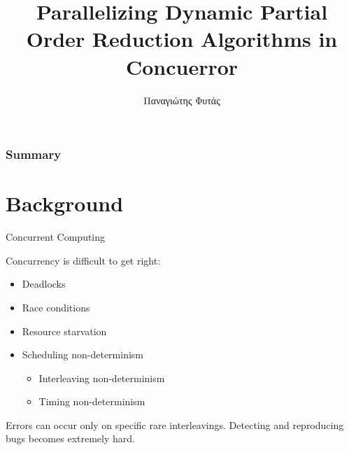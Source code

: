 \documentclass[9pt]{beamer}
\title[Short title]{Parallelizing Dynamic Partial Order Reduction Algorithms in Concuerror} %
\author{Παναγιώτης Φυτάς} %
\institute[NTUA] %
{
ΣΗΜΜΥ - ΕΜΠ \\ %
\medskip
\textit{03112113} %
}
\date{} %
\begin{document}
\begin{frame}
\titlepage %
\end{frame}

\begin{frame}
\frametitle{Summary} %
\tableofcontents %
\end{frame}






\AtBeginSection{\frame{\sectionpage}}
\section{Background}

\begin{frame}{Concurrent Computing}

Concurrency is difficult to get right:
\pause
\begin{itemize}[<+->]
    \item Deadlocks
    \item Race conditions
    \item Resource starvation 
    \item Scheduling non-determinism
    \begin{itemize}[<+->]
        \item Interleaving non-determinism
        \item Timing non-determinism
    \end{itemize}
\end{itemize}
\pause
Errors can occur only on specific rare interleavings. 
Detecting and reproducing bugs becomes extremely hard.

\end{frame}
\end{document}
